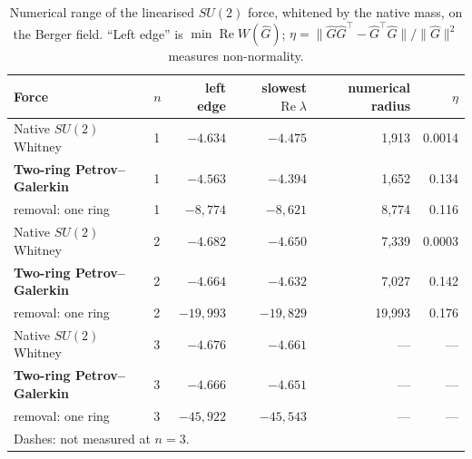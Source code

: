 \documentclass[11pt]{article}
\theoremstyle{definition}
\theoremstyle{remark}
\newcommand{\norm}[1]{\lVert #1\rVert}
\begin{document}
\begin{table}[t]\centering\small
\caption{Numerical range of the linearised $SU(2)$ force, whitened by the native mass, on
the Berger field. ``Left edge'' is $\min\operatorname{Re}W(\hat G)$; $\eta=\norm{\hat G\hat G^\top-\hat G^\top\hat G}/\norm{\hat G}^2$
measures non-normality.}
\label{tab:su2numrange}
\begin{tabular}{llrrrr}\toprule
Force & $n$ & left edge & slowest $\operatorname{Re}\lambda$ & numerical radius & $\eta$ \\ \midrule
Native $SU(2)$ Whitney & 1 & $-4.634$ & $-4.475$ & 1{,}913 & 0.0014 \\
\textbf{Two-ring Petrov--Galerkin} & 1 & $\mathbf{-4.563}$ & $-4.394$ & 1{,}652 & 0.134 \\
removal: one ring & 1 & $-8{,}774$ & $-8{,}621$ & 8{,}774 & 0.116 \\ \midrule
Native $SU(2)$ Whitney & 2 & $-4.682$ & $-4.650$ & 7{,}339 & 0.0003 \\
\textbf{Two-ring Petrov--Galerkin} & 2 & $\mathbf{-4.664}$ & $-4.632$ & 7{,}027 & 0.142 \\
removal: one ring & 2 & $-19{,}993$ & $-19{,}829$ & 19{,}993 & 0.176 \\ \midrule
Native $SU(2)$ Whitney & 3 & $-4.676$ & $-4.661$ & --- & --- \\
\textbf{Two-ring Petrov--Galerkin} & 3 & $\mathbf{-4.666}$ & $-4.651$ & --- & --- \\
removal: one ring & 3 & $-45{,}922$ & $-45{,}543$ & --- & --- \\
\bottomrule
\multicolumn{6}{l}{\footnotesize Dashes: not measured at $n=3$.}\\
\end{tabular}
\end{table}
\end{document}
